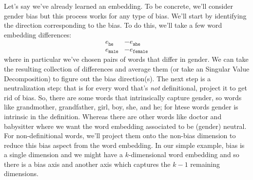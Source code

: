 \documentclass[12pt]{article}
\begin{document}
Let's say we've already learned an embedding. To be concrete, we'll consider gender bias but this process works for any type of bias. We'll start by identifying the direction corresponding to the bias. To do this, we'll take a few word embedding differences:
\begin{align*}
  e_{\texttt{he}} &- e_{\texttt{she}} \\
  e_{\texttt{male}} &- e_{\texttt{female}}
\end{align*}
where in particular we've chosen pairs of words that differ in gender. We can take the resulting collection of differences and average them (or take an Singular Value Decomposition) to figure out the bias direction(s). The next step is a neutralization step: that is for every word that's \emph{not} definitional, project it to get rid of bias. So, there are some words that intrinsically capture gender, so words like grandmother, grandfather, girl, boy, she, and he; for htese words gender is intrinsic in the definition. Whereas there are other words like doctor and babysitter where we want the word embedding associated to be (gender) neutral. For non-definitional words, we'll project them onto the non-bias dimension to reduce this bias aspect from the word embedding. In our simple example, bias is a single dimension and we might have a $k$-dimensional word embedding and so there is a bias axis and another axis which captures the $k-1$ remaining dimensions.

\end{document}
